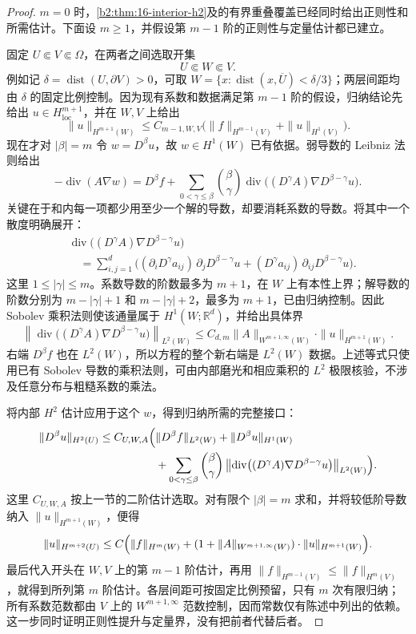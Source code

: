 \begin{proof}
\(m=0\) 时，\cref{b2:thm:16-interior-h2}及的有界重叠覆盖已经同时给出正则性和所需估计。下面设 \(m\geq1\)，并假设第 \(m-1\) 阶的正则性与定量估计都已建立。

固定 \(U\Subset V\Subset\Omega\)，在两者之间选取开集
\[
 U\Subset W\Subset V.
\]
例如记 \(\delta=\operatorname{dist}(U,\partial V)>0\)，可取
\(W=\{x:\operatorname{dist}(x,\overline U)<\delta/3\}\)；两层间距均由 \(\delta\) 的固定比例控制。因为现有系数和数据满足第 \(m-1\) 阶的假设，归纳结论先给出 \(u\in H_{\mathrm{loc}}^{m+1}\)，并在 \(W,V\) 上给出
\[
 \|u\|_{H^{m+1}(W)}
 \leq C_{m-1,W,V}
       \bigl(\|f\|_{H^{m-1}(V)}+\|u\|_{H^1(V)}\bigr).
\]
现在才对 \(|\beta|=m\) 令 \(w=D^\beta u\)，故 \(w\in H^1(W)\) 已有依据。弱导数的 Leibniz 法则给出
\[
 -\operatorname{div}(A\nabla w)
 =D^\beta f+\sum_{0<\gamma\le\beta}\binom\beta\gamma
       \operatorname{div}\bigl((D^\gamma A)\nabla D^{\beta-\gamma}u\bigr).
\]
关键在于和内每一项都少用至少一个解的导数，却要消耗系数的导数。将其中一个散度明确展开：
\[
 \begin{aligned}
 &\operatorname{div}\bigl((D^\gamma A)\nabla D^{\beta-\gamma}u\bigr)\\
 &\quad=\sum_{i,j=1}^d
 \bigl((\partial_iD^\gamma a_{ij})\,\partial_jD^{\beta-\gamma}u
       +(D^\gamma a_{ij})\,\partial_{ij}D^{\beta-\gamma}u\bigr).
 \end{aligned}
\]
这里 \(1\leq|\gamma|\leq m\)。系数导数的阶数最多为 \(m+1\)，在 \(W\) 上有本性上界；解导数的阶数分别为 \(m-|\gamma|+1\) 和 \(m-|\gamma|+2\)，最多为 \(m+1\)，已由归纳控制。因此 Sobolev 乘积法则使该通量属于 \(H^1(W;\mathbb R^d)\)，并给出具体界
\[
 \left\|\operatorname{div}\bigl((D^\gamma A)
              \nabla D^{\beta-\gamma}u\bigr)\right\|_{L^2(W)}
 \leq C_{d,m}\|A\|_{W^{m+1,\infty}(W)}
                    \cdot\|u\|_{H^{m+1}(W)}.
\]
右端 \(D^\beta f\) 也在 \(L^2(W)\)，所以方程的整个新右端是 \(L^2(W)\) 数据。上述等式只使用已有 Sobolev 导数的乘积法则，可由内部磨光和相应乘积的 \(L^2\) 极限核验，不涉及任意分布与粗糙系数的乘法。

将内部 \(H^2\) 估计应用于这个 \(w\)，得到归纳所需的完整接口：
\[
 \begin{aligned}
 \|D^\beta u\|_{H^2(U)}
 \leq C_{U,W,A}\Bigl(&\|D^\beta f\|_{L^2(W)}
                   +\|D^\beta u\|_{H^1(W)}\\
 &+\sum_{0<\gamma\leq\beta}\binom\beta\gamma
 \left\|\operatorname{div}\bigl((D^\gamma A)
                 \nabla D^{\beta-\gamma}u\bigr)\right\|_{L^2(W)}
                         \Bigr).
 \end{aligned}
\]
这里 \(C_{U,W,A}\) 按上一节的二阶估计选取。对有限个 \(|\beta|=m\) 求和，并将较低阶导数纳入 \(\|u\|_{H^{m+1}(W)}\)，便得
\[
 \|u\|_{H^{m+2}(U)}
 \leq C\Bigl(\|f\|_{H^m(W)}
       +(1+\|A\|_{W^{m+1,\infty}(W)})
                    \cdot\|u\|_{H^{m+1}(W)}\Bigr).
\]
最后代入开头在 \(W,V\) 上的第 \(m-1\) 阶估计，再用
\(\|f\|_{H^{m-1}(V)}\leq\|f\|_{H^m(V)}\)，就得到所列第 \(m\) 阶估计。各层间距可按固定比例预留，只有 \(m\) 次有限归纳；所有系数范数都由 \(V\) 上的 \(W^{m+1,\infty}\) 范数控制，因而常数仅有陈述中列出的依赖。这一步同时证明正则性提升与定量界，没有把前者代替后者。
\end{proof}

